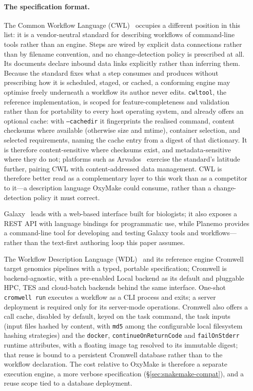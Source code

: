 \documentclass[12pt,a4paper]{article}
\newcommand{\code}[1]{{\texttt{\small\color{inlinecode}#1}}}
\begin{document}
\paragraph{The specification format.}
The Common Workflow Language
(CWL)~\cite{crusoeMethodsIncludedStandardizing2022} occupies a different
position in this list: it is a vendor-neutral standard for describing
workflows of command-line tools rather than an engine. Steps are wired
by explicit data connections rather than by filename convention, and
no change-detection policy is prescribed at all. Its documents
declare inbound data links explicitly rather than inferring them.
Because the standard fixes what a step
consumes and produces without prescribing how it is scheduled, staged,
or cached, a conforming engine may optimise freely underneath a workflow
its author never edits. \code{cwltool}, the reference implementation, is
scoped for feature-completeness and validation rather than for
portability to every host operating system, and already offers an
optional cache: with \code{--cachedir} it fingerprints the realised
command, content checksums where available (otherwise size and mtime),
container selection, and selected requirements, naming the cache entry
from a digest of that dictionary. It is therefore content-sensitive
where checksums exist, and metadata-sensitive where they do not;
platforms such as Arvados~\cite{arvados} exercise the standard's
latitude further, pairing CWL with content-addressed data
management. CWL is therefore better read as a complementary layer to
this work than as a competitor to it---a description language OxyMake
could consume, rather than a change-detection policy it must
correct.

Galaxy~\cite{afganGalaxyPlatformAccessible2018}
leads with a web-based interface built for biologists; it also exposes
a REST API with language bindings for programmatic use, while
Planemo provides a command-line tool for developing and testing Galaxy
tools and workflows---rather than
the text-first authoring loop this paper assumes.

The Workflow
Description Language (WDL)~\cite{vossWDLCromwell2017} and its reference
engine Cromwell target genomics pipelines with a typed, portable
specification; Cromwell is backend-agnostic, with a pre-enabled Local
backend as its default and pluggable HPC, TES and cloud-batch backends
behind the same interface. One-shot \code{cromwell run} executes a
workflow as a CLI process and exits; a server deployment is required
only for its server-mode operations. Cromwell also offers a call cache,
disabled by default, keyed on the task command, the task inputs (input
files hashed by content, with \code{md5} among the configurable local
filesystem hashing strategies)
and the \code{docker}, \code{continueOnReturnCode} and
\code{failOnStderr} runtime attributes, with a floating image tag
resolved to its immutable digest; that reuse is bound to a persistent
Cromwell database rather than to the workflow declaration. The cost
relative to OxyMake is therefore a separate execution engine, a
more verbose specification
(\S\ref{sec:snakemake-compat}), and a reuse scope tied to a database
deployment.
\end{document}
